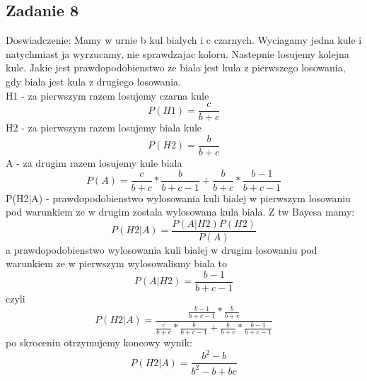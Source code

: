 \subsection{Zadanie 8}

Doswiadczenie: Mamy w urnie b kul bialych i c czarnych. Wyciagamy jedna kule i natychmiast ja wyrzucamy, nie sprawdzajac koloru. Nastepnie losujemy kolejna kule. Jakie jest prawdopodobienstwo ze biala jest kula z pierwszego losowania, gdy biala jest kula z drugiego losowania.  
$$
$$
H1 - za pierwszym razem losujemy czarna kule
$$
P(H1) = \frac{c}{b+c}
$$
H2 - za pierwszym razem losujemy biala kule
$$
P(H2) = \frac{b}{b+c}
$$
A -  za drugim razem losujemy kule biala
$$
P(A) = \frac{c}{b+c}*\frac{b}{b+c-1} + \frac{b}{b+c}*\frac{b-1}{b+c-1}
$$
P(H2|A) - prawdopodobienstwo wylosowania kuli bialej w pierwszym losowaniu pod warunkiem ze w drugim zostala wylosowana kula biala.
Z tw Bayesa mamy:
$$
P(H2|A) = \frac{P(A|H2)P(H2)}{P(A)}
$$
a prawdopodobienstwo wylosowania kuli bialej w drugim losowaniu pod warunkiem ze w pierwszym wylosowalismy biala to
$$
P(A|H2) = \frac{b-1}{b+c-1}
$$
czyli
$$
P(H2|A) = \frac{ \frac{b-1}{b+c-1} * \frac{b}{b+c} }{ \frac{c}{b+c}*\frac{b}{b+c-1} + \frac{b}{b+c}*\frac{b-1}{b+c-1} }
$$
po skroceniu otrzymujemy koncowy wynik:
$$
P(H2|A) =\frac{ b^{2} - b} {b^{2} - b + bc}
$$

